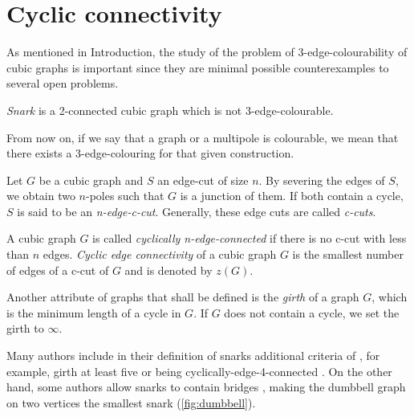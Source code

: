 \section{Cyclic connectivity}\label{sec:snarks}

As mentioned in Introduction, the study of the problem of 3-edge-colourability of cubic graphs is important since they are minimal possible counterexamples to several open problems.



\begin{definition}\label{def:snark}
	\textit{Snark} is a 2-connected cubic graph which is not 3-edge-colourable.
\end{definition}

From now on, if we say that a graph or a multipole is colourable, we mean that there exists a 3-edge-colouring for that given construction.

Let $G$ be a cubic graph and $S$ an edge-cut of size $n$. By severing the edges of $S$, we obtain two $n$-poles such that $G$ is a junction of them. If both contain a cycle, $S$ is said to be an \textit{n-edge-c-cut}. Generally, these edge cuts are called \textit{c-cuts}. 

A cubic graph $G$ is called \textit{cyclically n-edge-connected} if there is no c-cut with less than $n$ edges. \textit{Cyclic edge connectivity} of a cubic graph $G$ is the smallest number of edges of a c-cut of $G$ and is denoted by $z(G)$.

Another attribute of graphs that shall be defined is the \textit{girth} of a graph $G$, which is the minimum length of a cycle in $G$. If $G$ does not contain a cycle, we set the girth to $\infty$.

Many authors include in their definition of snarks additional criteria of , for example, girth at least five or being cyclically-edge-4-connected \cite{Preissmann1983, Nedela1996}. On the other hand, some authors allow snarks to contain bridges \cite{IrreducibleSnarksSkoviera}, making the dumbbell graph on two vertices the smallest snark (\cref{fig:dumbbell}).

